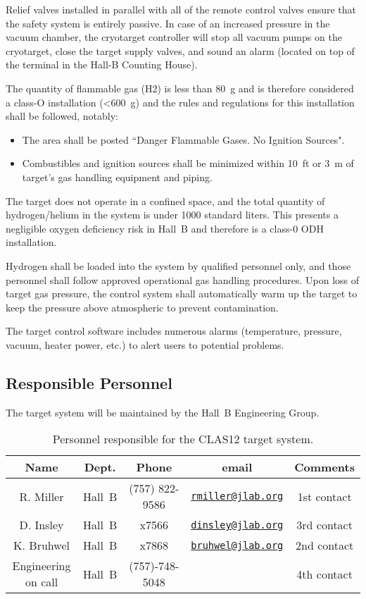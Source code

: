 Relief valves installed in parallel with all of the remote control valves ensure that the 
safety system is entirely passive. In case of an increased pressure in the vacuum chamber, 
the cryotarget controller will stop all vacuum pumps on the cryotarget, close the 
target supply valves, and sound an alarm (located on top of the terminal 
in the Hall-B Counting House).

The quantity of flammable gas (H2) is less than 80~g and is therefore considered a class-O 
installation (<600~g) and the rules and regulations for this installation shall be followed, 
notably:

\begin{itemize}

\item The area shall be posted ``Danger Flammable Gases.  No Ignition Sources".

\item Combustibles and ignition sources shall be minimized within 10~ft or 3~m of target's gas 
handling equipment and piping.
\end{itemize}

The target does not operate in a confined space, and the total quantity of hydrogen/helium in 
the system is under 1000 standard liters. This presents a negligible oxygen deficiency risk in 
Hall~B and therefore is a class-0 ODH installation.

Hydrogen shall be loaded into the system by qualified personnel only, and those personnel shall 
follow approved operational gas handling procedures.   Upon loss of target gas pressure, the 
control system shall automatically warm up the target to keep the pressure above atmospheric to 
prevent contamination. 

The target control software includes numerous alarms (temperature, pressure, vacuum, heater 
power, etc.) to alert users to potential problems. 


\subsection{Responsible Personnel}

The target system will be maintained by the Hall~B Engineering Group.  

\begin{table}[!htb]
\centering
\begin{tabular}{|c|c|c|c|c|}
\hline
 Name&Dept.&Phone&email&Comments \\ \hline
R. Miller &Hall~B&(757) 822-9586&\href{mailto:rmiller@jlab.org}{\nolinkurl{rmiller@jlab.org}} &1st contact \\ \hline
D. Insley & Hall~B&x7566&\href{mailto:dinsley@jlab.org}{\nolinkurl{dinsley@jlab.org}}  &3rd contact \\ \hline
K. Bruhwel& Hall~B&x7868&\href{mailto:bruhwel@jlab.org}{\nolinkurl{bruhwel@jlab.org}}&2nd contact \\ \hline
Engineering on call & Hall~B&(757)-748-5048&& 4th contact  \\ \hline
\end{tabular}
\caption{Personnel responsible for the CLAS12 target system.} 
\label{tb:target}
\end{table}
